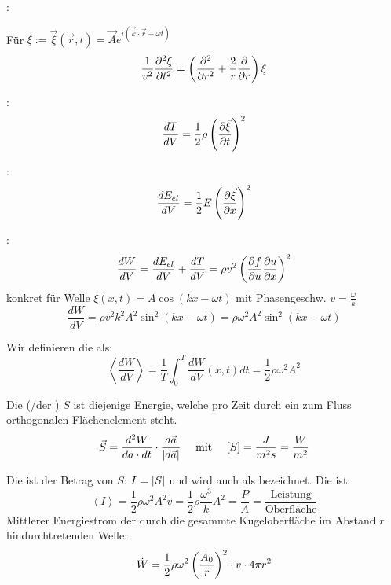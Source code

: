 \pagebreak

:

Für $\xi := \vec{\xi}(\vec{r},t) = \vec{A} e^{i (\vec{k} \cdot \vec{r} - \omega t)}$
\[
    \frac{1}{v^2} \frac{\partial^2 \xi}{\partial t^2} = \left( \frac{\partial^2}{\partial r^2} + \frac{2}{r} \frac{\partial}{\partial r} \right) \xi
\]

\vspace{1\baselineskip}

\begin{minipage}{0.2\textwidth}
    :
    \[
        \frac{dT}{dV} = \frac{1}{2} \rho \left( \frac{\partial \vec{\xi}}{\partial t} \right)^2  
    \]
\end{minipage}
\begin{minipage}{0.2\textwidth}
    :
    \[
          \frac{dE_{el}}{dV} = \frac{1}{2} E \left( \frac{\partial \vec{\xi}}{\partial x} \right)^2
    \]
\end{minipage}

\vspace{1\baselineskip}

:
\[
    \frac{d W}{d V} = \frac{d E_{el}}{dV} + \frac{dT}{dV} =
    \rho v^2 \left( \frac{\partial f}{\partial u} \frac{\partial u}{\partial x} \right)^2  
\]
konkret für Welle $\xi(x,t)= A \cos (kx-\omega t)$ mit Phasengeschw. $v=\frac{\omega}{k}$
\[
    \frac{dW}{dV} =   \rho v^2 k^2 A^2 \sin^2 (kx-\omega t)
    = \rho \omega^2 A^2 \sin^2 (kx-\omega t)
\]

Wir definieren die  als:
\[
    \left\langle \frac{dW}{dV} \right\rangle  = \frac{1}{T} \int_0^T \frac{dW}{dV} (x,t) dt
    = \frac{1}{2} \rho \omega^2 A^2
\]

Die  (/der ) $S$ ist diejenige Energie, welche pro
Zeit durch ein zum Fluss orthogonalen Flächenelement steht.
\[
    \vec{S} = \frac{d^2 W}{da \cdot dt} \cdot \frac{d \vec{a}}{\left\vert d \vec{a} \right\vert}  
    \quad \text{ mit } \quad
    [S] = \frac{J}{m^2 s} = \frac{W}{m^2}
\]

Die  ist der Betrag von $S$: $I = \left\vert S \right\vert$ und wird auch als
 bezeichnet. Die  ist:
\[
    \left\langle I \right\rangle = \frac{1}{2} \rho \omega^2 A^2 v
    = \frac{1}{2} \rho \frac{\omega^3}{k} A^2  
    = \frac{P}{A} = \frac{\text{Leistung}}{\text{Oberfläche}}
\]
Mittlerer Energiestrom der durch die gesammte Kugeloberfläche im Abstand $r$
hindurchtretenden Welle:
\[
    \dot{W} = \frac{1}{2} \rho \omega^2 \left( \frac{A_0}{r} \right)^2 \cdot v \cdot 4 \pi r^2  
\]

